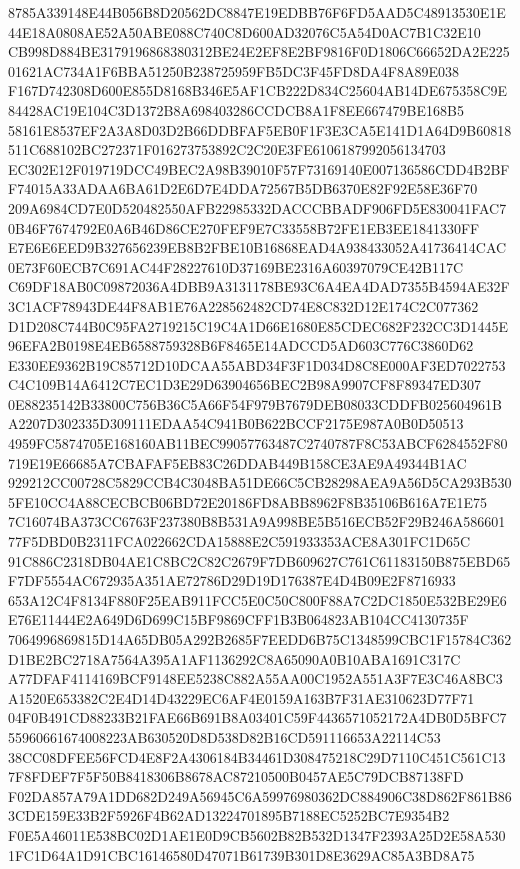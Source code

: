 \documentclass[UTF8,fontset=fandol,zihao=-4,a4paper]{ctexart}
\begin{document}
{{8785A339148E44B056B8D20562DC8847E19EDBB76F6FD5AAD5C48913530E1E44E18A0808AE52A50ABE088C740C8D600AD32076C5A54D0AC7B1C32E10
CB998D884BE3179196868380312BE24E2EF8E2BF9816F0D1806C66652DA2E22501621AC734A1F6BBA51250B238725959FB5DC3F45FD8DA4F8A89E038
F167D742308D600E855D8168B346E5AF1CB222D834C25604AB14DE675358C9E84428AC19E104C3D1372B8A698403286CCDCB8A1F8EE667479BE168B5
58161E8537EF2A3A8D03D2B66DDBFAF5EB0F1F3E3CA5E141D1A64D9B60818511C688102BC272371F016273753892C2C20E3FE6106187992056134703
EC302E12F019719DCC49BEC2A98B39010F57F73169140E007136586CDD4B2BFF74015A33ADAA6BA61D2E6D7E4DDA72567B5DB6370E82F92E58E36F70
209A6984CD7E0D520482550AFB22985332DACCCBBADF906FD5E830041FAC70B46F7674792E0A6B46D86CE270FEF9E7C33558B72FE1EB3EE1841330FF
E7E6E6EED9B327656239EB8B2FBE10B16868EAD4A938433052A41736414CAC0E73F60ECB7C691AC44F28227610D37169BE2316A60397079CE42B117C
C69DF18AB0C09872036A4DBB9A3131178BE93C6A4EA4DAD7355B4594AE32F3C1ACF78943DE44F8AB1E76A228562482CD74E8C832D12E174C2C077362
D1D208C744B0C95FA2719215C19C4A1D66E1680E85CDEC682F232CC3D1445E96EFA2B0198E4EB6588759328B6F8465E14ADCCD5AD603C776C3860D62
E330EE9362B19C85712D10DCAA55ABD34F3F1D034D8C8E000AF3ED7022753C4C109B14A6412C7EC1D3E29D63904656BEC2B98A9907CF8F89347ED307
0E88235142B33800C756B36C5A66F54F979B7679DEB08033CDDFB025604961BA2207D302335D309111EDAA54C941B0B622BCCF2175E987A0B0D50513
4959FC5874705E168160AB11BEC99057763487C2740787F8C53ABCF6284552F80719E19E66685A7CBAFAF5EB83C26DDAB449B158CE3AE9A49344B1AC
929212CC00728C5829CCB4C3048BA51DE66C5CB28298AEA9A56D5CA293B5305FE10CC4A88CECBCB06BD72E20186FD8ABB8962F8B35106B616A7E1E75
7C16074BA373CC6763F237380B8B531A9A998BE5B516ECB52F29B246A58660177F5DBD0B2311FCA022662CDA15888E2C591933353ACE8A301FC1D65C
91C886C2318DB04AE1C8BC2C82C2679F7DB609627C761C61183150B875EBD65F7DF5554AC672935A351AE72786D29D19D176387E4D4B09E2F8716933
653A12C4F8134F880F25EAB911FCC5E0C50C800F88A7C2DC1850E532BE29E6E76E11444E2A649D6D699C15BF9869CFF1B3B064823AB104CC4130735F
7064996869815D14A65DB05A292B2685F7EEDD6B75C1348599CBC1F15784C362D1BE2BC2718A7564A395A1AF1136292C8A65090A0B10ABA1691C317C
A77DFAF4114169BCF9148EE5238C882A55AA00C1952A551A3F7E3C46A8BC3A1520E653382C2E4D14D43229EC6AF4E0159A163B7F31AE310623D77F71
04F0B491CD88233B21FAE66B691B8A03401C59F4436571052172A4DB0D5BFC755960661674008223AB630520D8D538D82B16CD591116653A22114C53
38CC08DFEE56FCD4E8F2A4306184B34461D308475218C29D7110C451C561C137F8FDEF7F5F50B8418306B8678AC87210500B0457AE5C79DCB87138FD
F02DA857A79A1DD682D249A56945C6A59976980362DC884906C38D862F861B863CDE159E33B2F5926F4B62AD13224701895B7188EC5252BC7E9354B2
F0E5A46011E538BC02D1AE1E0D9CB5602B82B532D1347F2393A25D2E58A5301FC1D64A1D91CBC16146580D47071B61739B301D8E3629AC85A3BD8A75
}}
\end{document}
